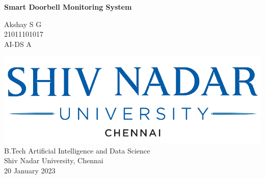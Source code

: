 \begin{titlepage}
    \centering
        \vspace*{2cm}
        \Huge
        \textbf{Smart Doorbell Monitoring System}
        
        \vspace*{0.6cm}
        \Large
        \textit{}
        
        \Large
        \vspace*{1.5cm}
        Akshay S G\\
        \vspace{0.2cm}
        21011101017\\
        \vspace{0.2cm}
        AI-DS A\\
        
        \vfill              
        
        \vfill
        
        
        \includegraphics{images/snu.png}\\
        B.Tech Artificial Intelligence and Data Science\\
        Shiv Nadar University, Chennai\\
        20 January 2023
        \vspace*{1cm}
    
\end{titlepage}

